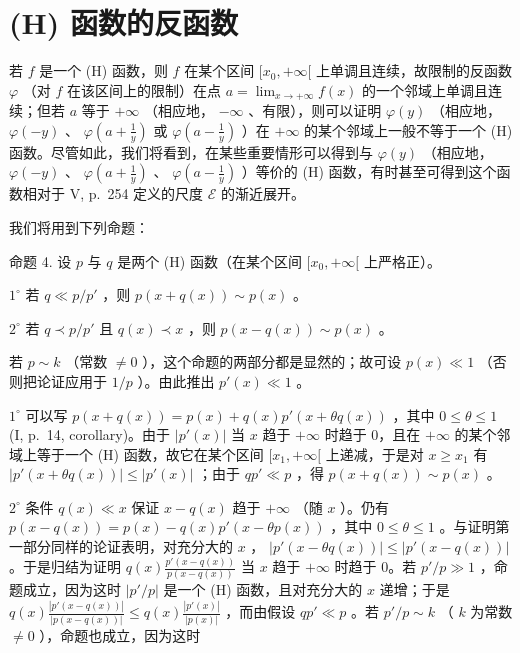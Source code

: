 \section{(H) 函数的反函数}

若 \(f\) 是一个 (H) 函数，则 \(f\) 在某个区间 \([x_0, +\infty[\) 上单调且连续，故限制的反函数 \(\varphi\) （对 \(f\) 在该区间上的限制）在点 \(a = \lim_{x \to +\infty} f(x)\) 的一个邻域上单调且连续；但若 \(a\) 等于 \(+\infty\) （相应地， \(-\infty\) 、有限），则可以证明 \(\varphi(y)\) （相应地， \(\varphi(-y)\) 、 \(\varphi(a + \frac{1}{y})\) 或 \(\varphi(a - \frac{1}{y})\) ）在 \(+\infty\) 的某个邻域上一般不等于一个 (H) 函数。尽管如此，我们将看到，在某些重要情形可以得到与 \(\varphi(y)\) （相应地， \(\varphi(-y)\) 、 \(\varphi(a + \frac{1}{y})\) 、 \(\varphi(a - \frac{1}{y})\) ）等价的 (H) 函数，有时甚至可得到这个函数相对于 V, p.~254 定义的尺度 \(\mathcal{E}\) 的渐近展开。

我们将用到下列命题：

命题 4. 设 \(p\) 与 \(q\) 是两个 (H) 函数（在某个区间 \([x_0, +\infty[\) 上严格正）。

\(1^{\circ}\) 若 \(q \ll p / p'\) ，则 \(p(x + q(x)) \sim p(x)\) 。

\(2^{\circ}\) 若 \(q \prec p/p'\) 且 \(q(x) \prec x\) ，则 \(p(x - q(x)) \sim p(x)\) 。

若 \(p \sim k\) （常数 \(\neq 0\) ），这个命题的两部分都是显然的；故可设 \(p(x) \ll 1\) （否则把论证应用于 \(1/p\) ）。由此推出 \(p'(x) \ll 1\) 。

\(1^{\circ}\) 可以写 \(p(x + q(x)) = p(x) + q(x)p'(x + \theta q(x))\) ，其中 \(0 \leqslant \theta \leqslant 1\) (I, p.~14, corollary)。由于 \(\left|p'(x)\right|\) 当 \(x\) 趋于 \(+\infty\) 时趋于 0，且在 \(+\infty\) 的某个邻域上等于一个 (H) 函数，故它在某个区间 \([x_1, +\infty[\) 上递减，于是对 \(x \geqslant x_1\) 有 \(\left|p'(x + \theta q(x))\right| \leqslant \left|p'(x)\right|\) ；由于 \(qp' \ll p\) ，得 \(p(x + q(x)) \sim p(x)\) 。

\(2^{\circ}\) 条件 \(q(x) \ll x\) 保证 \(x - q(x)\) 趋于 \(+\infty\) （随 \(x\) ）。仍有 \(p(x - q(x)) = p(x) - q(x)p'(x - \theta p(x))\) ，其中 \(0 \leqslant \theta \leqslant 1\) 。与证明第一部分同样的论证表明，对充分大的 \(x\) ， \(\left|p'(x - \theta q(x))\right| \leqslant \left|p'(x - q(x))\right|\) 。于是归结为证明 \(q(x)\frac{p'(x - q(x))}{p(x - q(x))}\) 当 \(x\) 趋于 \(+\infty\) 时趋于 0。若 \(p'/p \gg 1\) ，命题成立，因为这时 \(\left|p'/p\right|\) 是一个 (H) 函数，且对充分大的 \(x\) 递增；于是 \(q(x)\frac{\left|p'(x - q(x))\right|}{\left|p(x - q(x))\right|} \leqslant q(x)\frac{\left|p'(x)\right|}{\left|p(x)\right|}\) ，而由假设 \(qp' \ll p\) 。若 \(p'/p \sim k\) （ \(k\) 为常数 \(\neq 0\) ），命题也成立，因为这时

